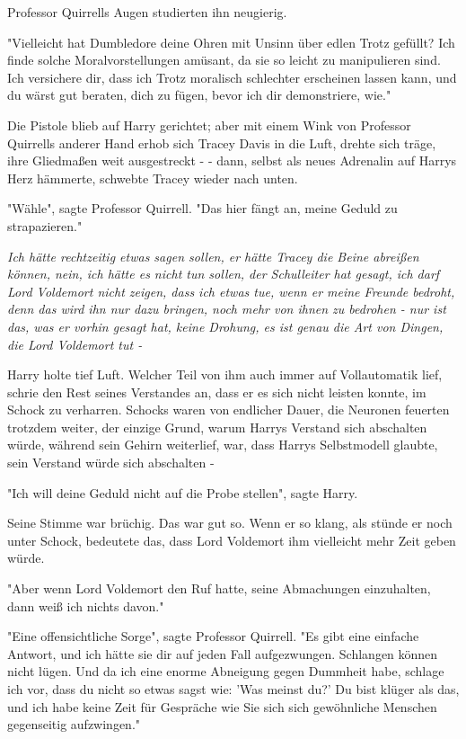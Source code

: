 {Professor Quirrells Augen studierten ihn neugierig.

"Vielleicht hat Dumbledore deine Ohren mit Unsinn über edlen Trotz gefüllt? Ich finde solche Moralvorstellungen amüsant, da sie so leicht zu manipulieren sind. Ich versichere dir, dass ich Trotz moralisch schlechter erscheinen lassen kann, und du wärst gut beraten, dich zu fügen, bevor ich dir demonstriere, wie."

Die Pistole blieb auf Harry gerichtet; aber mit einem Wink von Professor Quirrells anderer Hand erhob sich Tracey Davis in die Luft, drehte sich träge, ihre Gliedmaßen weit ausgestreckt - - dann, selbst als neues Adrenalin auf Harrys Herz hämmerte, schwebte Tracey wieder nach unten.

"Wähle", sagte Professor Quirrell. "Das hier fängt an, meine Geduld zu strapazieren."

\emph{Ich hätte rechtzeitig etwas sagen sollen, er hätte Tracey die Beine abreißen können, nein, ich hätte es nicht tun sollen, der Schulleiter hat gesagt, ich darf Lord Voldemort nicht zeigen, dass ich etwas tue, wenn er meine Freunde bedroht, denn das wird ihn nur dazu bringen, noch mehr von ihnen zu bedrohen - nur ist das, was er vorhin gesagt hat, keine Drohung, es ist genau die Art von Dingen, die Lord Voldemort tut -}

Harry holte tief Luft. Welcher Teil von ihm auch immer auf Vollautomatik lief, schrie den Rest seines Verstandes an, dass er es sich nicht leisten konnte, im Schock zu verharren. Schocks waren von endlicher Dauer, die Neuronen feuerten trotzdem weiter, der einzige Grund, warum Harrys Verstand sich abschalten würde, während sein Gehirn weiterlief, war, dass Harrys Selbstmodell glaubte, sein Verstand würde sich abschalten -

"Ich will deine Geduld nicht auf die Probe stellen", sagte Harry.

Seine Stimme war brüchig. Das war gut so. Wenn er so klang, als stünde er noch unter Schock, bedeutete das, dass Lord Voldemort ihm vielleicht mehr Zeit geben würde.

"Aber wenn Lord Voldemort den Ruf hatte, seine Abmachungen einzuhalten, dann weiß ich nichts davon."

"Eine offensichtliche Sorge", sagte Professor Quirrell. "Es gibt eine einfache Antwort, und ich hätte sie dir auf jeden Fall aufgezwungen. Schlangen können nicht lügen. Und da ich eine enorme Abneigung gegen Dummheit habe, schlage ich vor, dass du nicht so etwas sagst wie: 'Was meinst du?' Du bist klüger als das, und ich habe keine Zeit für Gespräche wie Sie sich sich gewöhnliche Menschen gegenseitig aufzwingen."

}
